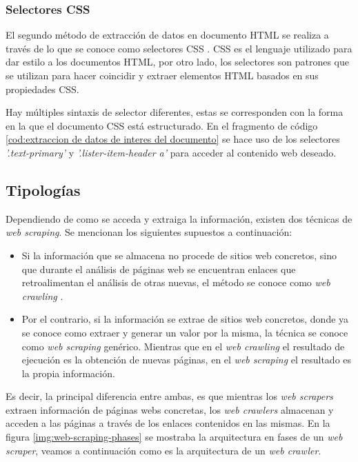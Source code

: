 \subsubsection{Selectores CSS}
\label{subsubsec:selectores CSS}

El segundo método de extracción de datos en documento HTML se realiza a través de lo que se conoce como
selectores CSS \cite{css-xpath-lilland}. CSS es el lenguaje utilizado para dar estilo a los documentos
HTML, por otro lado, los selectores son patrones que se utilizan para hacer coincidir y extraer elementos
HTML basados en sus propiedades CSS.

Hay múltiples sintaxis de selector diferentes, estas se corresponden con la forma en la que el documento
CSS está estructurado. En el fragmento de código \ref{cod:extraccion de datos de interes del documento}
se hace uso de los selectores \emph{'.text-primary'} y \emph{'.lister-item-header a'} para acceder al
contenido web deseado.

\subsection{Tipologías}
\label{subsec:tipologias}

Dependiendo de como se acceda y extraiga la información, existen dos técnicas de \emph{web scraping}. Se 
mencionan los siguientes supuestos a continuación:

\begin{itemize}
\item Si la información que se almacena no procede de sitios web concretos, sino que durante el análisis
de páginas web se encuentran enlaces que retroalimentan el análisis de otras nuevas, el método se conoce
como \emph{web crawling} \cite{Andreas-Mehlfuhrer}.

\item Por el contrario, si la información se extrae de sitios web concretos, donde ya se conoce como extraer 
y generar un valor por la misma, la técnica se conoce como \emph{web scraping} genérico. Mientras que en 
el \emph{web crawling} el resultado de ejecución es la obtención de nuevas páginas, en el \emph{web scraping} 
el resultado es la propia información.
\end{itemize}

Es decir, la principal diferencia entre ambas, es que mientras los \emph{web scrapers} extraen información 
de páginas webs concretas, los \emph{web crawlers} almacenan y acceden a las páginas a través de los enlaces
contenidos en las mismas. En la figura \ref{img:web-scraping-phases} se mostraba la arquitectura en fases
de un \emph{web scraper}, veamos a continuación como es la arquitectura de un \emph{web crawler}.

